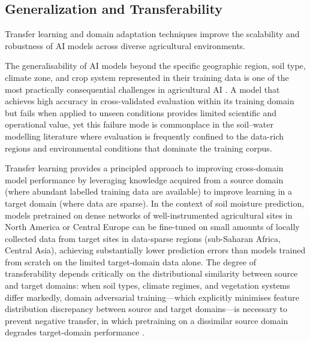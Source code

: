 \documentclass[land,article,submit,pdftex,moreauthors]{Definitions/mdpi}
\numberwithin{equation}{section}
\begin{document}
\subsection{Generalization and Transferability}

Transfer learning and domain adaptation techniques improve the scalability and robustness of AI models across diverse agricultural environments.

The generalisability of AI models beyond the specific geographic region, soil type, climate zone, and crop system represented in their training data is one of the most practically consequential challenges in agricultural AI \citep{reichstein2019deep}. A model that achieves high accuracy in cross-validated evaluation within its training domain but fails when applied to unseen conditions provides limited scientific and operational value, yet this failure mode is commonplace in the soil--water modelling literature where evaluation is frequently confined to the data-rich regions and environmental conditions that dominate the training corpus.

Transfer learning provides a principled approach to improving cross-domain model performance by leveraging knowledge acquired from a source domain (where abundant labelled training data are available) to improve learning in a target domain (where data are sparse). In the context of soil moisture prediction, models pretrained on dense networks of well-instrumented agricultural sites in North America or Central Europe can be fine-tuned on small amounts of locally collected data from target sites in data-sparse regions (sub-Saharan Africa, Central Asia), achieving substantially lower prediction errors than models trained from scratch on the limited target-domain data alone. The degree of transferability depends critically on the distributional similarity between source and target domains: when soil types, climate regimes, and vegetation systems differ markedly, domain adversarial training---which explicitly minimises feature distribution discrepancy between source and target domains---is necessary to prevent negative transfer, in which pretraining on a dissimilar source domain degrades target-domain performance \citep{pan2010survey}.
\end{document}
